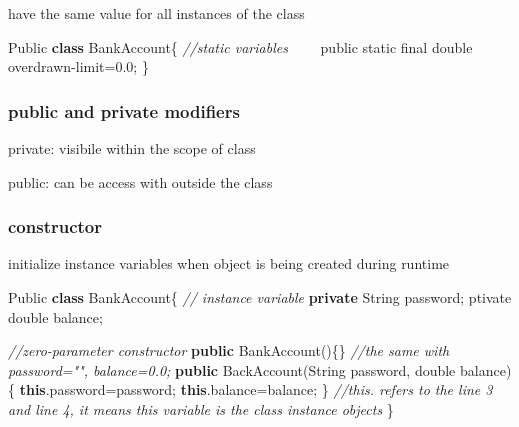 \documentclass[
  paper=a4,
  ,captions=tableheading
]{scrartcl}
\newenvironment{Shaded}{}{}
\newcommand{\BuiltInTok}[1]{#1}
\newcommand{\CommentTok}[1]{\textcolor[rgb]{0.38,0.63,0.69}{\textit{#1}}}
\newcommand{\DataTypeTok}[1]{\textcolor[rgb]{0.56,0.13,0.00}{#1}}
\newcommand{\FloatTok}[1]{\textcolor[rgb]{0.25,0.63,0.44}{#1}}
\newcommand{\FunctionTok}[1]{\textcolor[rgb]{0.02,0.16,0.49}{#1}}
\newcommand{\KeywordTok}[1]{\textcolor[rgb]{0.00,0.44,0.13}{\textbf{#1}}}
\newcommand{\NormalTok}[1]{#1}
\begin{document}
have the same value for all instances of the class

\begin{Shaded}
\begin{Highlighting}[]
\NormalTok{Public }\KeywordTok{class}\NormalTok{ BankAccount\{}
    \CommentTok{//static variables}
\NormalTok{    public }\DataTypeTok{static} \DataTypeTok{final} \DataTypeTok{double}\NormalTok{ overdrawn-limit=}\FloatTok{0.0}\NormalTok{;}
\NormalTok{\}}
\end{Highlighting}
\end{Shaded}

\hypertarget{public-and-private-modifiers}{%
\subsubsection{public and private
modifiers}\label{public-and-private-modifiers}}

private: visibile within the scope of class

public: can be access with outside the class

\hypertarget{constructor-1}{%
\subsubsection{constructor}\label{constructor-1}}

initialize instance variables when object is being created during
runtime

\begin{Shaded}
\begin{Highlighting}[]
\NormalTok{Public }\KeywordTok{class}\NormalTok{ BankAccount\{}
    \CommentTok{// instance variable}
    \KeywordTok{private} \BuiltInTok{String}\NormalTok{ password;}
\NormalTok{    ptivate }\DataTypeTok{double}\NormalTok{ balance;}

    \CommentTok{//zero-parameter constructor}
    \KeywordTok{public} \FunctionTok{BankAccount}\NormalTok{()\{\}}
    \CommentTok{//the same with password="", balance=0.0;}
    \KeywordTok{public} \FunctionTok{BackAccount}\NormalTok{(}\BuiltInTok{String}\NormalTok{ password, }\DataTypeTok{double}\NormalTok{ balance)}
\NormalTok{    \{}
        \KeywordTok{this}\NormalTok{.}\FunctionTok{password}\NormalTok{=password;}
        \KeywordTok{this}\NormalTok{.}\FunctionTok{balance}\NormalTok{=balance;}
\NormalTok{    \}}
    \CommentTok{//this. refers to the line 3 and line 4, it means this variable is the class instance objects}
\NormalTok{\}}
\end{Highlighting}
\end{Shaded}
\end{document}
